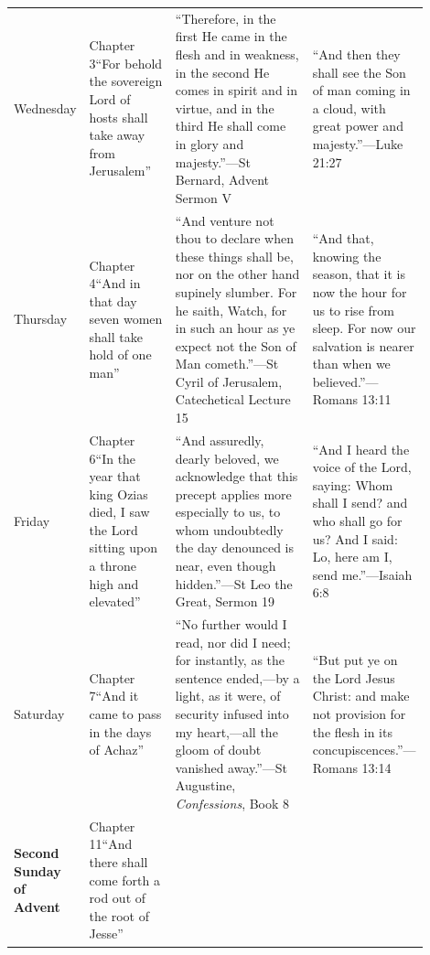 {\begin{longtable}{@{}>{\raggedright\arraybackslash}p{0.11\linewidth}>{\raggedright\arraybackslash}p{0.21\linewidth}>{\raggedright\arraybackslash}p{0.34\linewidth}>{\raggedright\arraybackslash}p{0.24\linewidth}@{}}
Wednesday &
Chapter 3\newline ``For behold the sovereign Lord of hosts shall take away from Jerusalem'' &
``Therefore, in the first He came in the flesh and in weakness, in the second He comes in spirit and in virtue, and in the third He shall come in glory and majesty.''\newline---St Bernard, Advent Sermon V &
``And then they shall see the Son of man coming in a cloud, with great power and majesty.''\newline---Luke 21:27\\
\addlinespace
Thursday &
Chapter 4\newline ``And in that day seven women shall take hold of one man'' &
``And venture not thou to declare when these things shall be, nor on the other hand supinely slumber. For he saith, Watch, for in such an hour as ye expect not the Son of Man cometh.''\newline---St Cyril of Jerusalem, Catechetical Lecture 15 &
``And that, knowing the season, that it is now the hour for us to rise from sleep. For now our salvation is nearer than when we believed.''\newline---Romans 13:11\\
\addlinespace
Friday &
Chapter 6\newline ``In the year that king Ozias died, I saw the Lord sitting upon a throne high and elevated'' &
``And assuredly, dearly beloved, we acknowledge that this precept applies more especially to us, to whom undoubtedly the day denounced is near, even though hidden.''\newline---St Leo the Great, Sermon 19 &
``And I heard the voice of the Lord, saying: Whom shall I send? and who shall go for us? And I said: Lo, here am I, send me.''\newline---Isaiah 6:8\\
\addlinespace
Saturday &
Chapter 7\newline ``And it came to pass in the days of Achaz'' &
``No further would I read, nor did I need; for instantly, as the sentence ended,---by a light, as it were, of security infused into my heart,---all the gloom of doubt vanished away.''\newline---St Augustine, \textit{Confessions}, Book 8 &
``But put ye on the Lord Jesus Christ: and make not provision for the flesh in its concupiscences.''\newline---Romans 13:14\\
\addlinespace[1em]
\textbf{Second Sunday of Advent} &
Chapter 11\newline ``And there shall come forth a rod out of the root of Jesse'' &

\end{longtable}}
